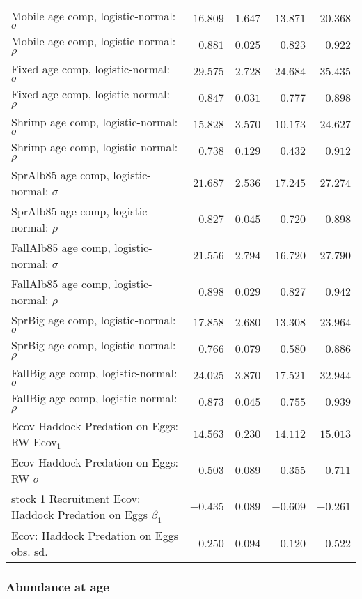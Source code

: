 \documentclass[
]{article}
\begin{document}
\begin{landscape}
\begin{longtable}[t]{lrrrr}
\addlinespace
Mobile age comp, logistic-normal: $\sigma$ & $16.809$ & $1.647$ & $13.871$ & $20.368$\\
Mobile age comp, logistic-normal: $\rho$ & $0.881$ & $0.025$ & $0.823$ & $0.922$\\
Fixed age comp, logistic-normal: $\sigma$ & $29.575$ & $2.728$ & $24.684$ & $35.435$\\
Fixed age comp, logistic-normal: $\rho$ & $0.847$ & $0.031$ & $0.777$ & $0.898$\\
Shrimp age comp, logistic-normal: $\sigma$ & $15.828$ & $3.570$ & $10.173$ & $24.627$\\
\addlinespace
Shrimp age comp, logistic-normal: $\rho$ & $0.738$ & $0.129$ & $0.432$ & $0.912$\\
SprAlb85 age comp, logistic-normal: $\sigma$ & $21.687$ & $2.536$ & $17.245$ & $27.274$\\
SprAlb85 age comp, logistic-normal: $\rho$ & $0.827$ & $0.045$ & $0.720$ & $0.898$\\
FallAlb85 age comp, logistic-normal: $\sigma$ & $21.556$ & $2.794$ & $16.720$ & $27.790$\\
FallAlb85 age comp, logistic-normal: $\rho$ & $0.898$ & $0.029$ & $0.827$ & $0.942$\\
\addlinespace
SprBig age comp, logistic-normal: $\sigma$ & $17.858$ & $2.680$ & $13.308$ & $23.964$\\
SprBig age comp, logistic-normal: $\rho$ & $0.766$ & $0.079$ & $0.580$ & $0.886$\\
FallBig age comp, logistic-normal: $\sigma$ & $24.025$ & $3.870$ & $17.521$ & $32.944$\\
FallBig age comp, logistic-normal: $\rho$ & $0.873$ & $0.045$ & $0.755$ & $0.939$\\
Ecov Haddock Predation on Eggs: RW Ecov$_1$ & $14.563$ & $0.230$ & $14.112$ & $15.013$\\
\addlinespace
Ecov Haddock Predation on Eggs: RW $\sigma$ & $0.503$ & $0.089$ & $0.355$ & $0.711$\\
stock 1 Recruitment Ecov: Haddock Predation on Eggs $\beta_1$ & $-0.435$ & $0.089$ & $-0.609$ & $-0.261$\\
Ecov: Haddock Predation on Eggs obs. sd. & $0.250$ & $0.094$ & $0.120$ & $0.522$\\*
\end{longtable}
\end{landscape}

\subsubsection{Abundance at age}\label{abundance-at-age}
\end{document}
